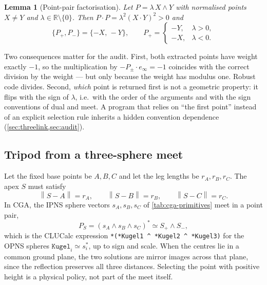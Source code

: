 \documentclass[11pt,a4paper]{article}
\theoremstyle{plain}
\newtheorem{lemma}{Lemma}
\theoremstyle{definition}
\theoremstyle{remark}
\newcommand{\R}{\mathbb{R}}
\newcommand{\einf}{e_{\infty}}
\newcommand{\norm}[1]{\left\lVert#1\right\rVert}
\begin{document}
\begin{lemma}[Point-pair factorisation]\label{lem:pointpair}
Let $P=\lambda\,X\wedge Y$ with normalised points $X\neq Y$ and
$\lambda\in\R\setminus\{0\}$. Then $P\cdot P=\lambda^2(X\cdot Y)^2>0$ and
\begin{equation}
  \{P_+,P_-\}=\{-X,\,-Y\},
  \qquad
  P_+=\begin{cases}-Y,&\lambda>0,\\ -X,&\lambda<0.\end{cases}
\end{equation}
\end{lemma}

Two consequences matter for the audit. First, both extracted points have weight
exactly $-1$, so the multiplication by $-P_\pm\cdot\einf=-1$ coincides with the
correct division by the weight --- but only because the weight has modulus one.
Robust code divides. Second, \emph{which} point is returned first is not a
geometric property: it flips with the sign of $\lambda$, i.e.\ with the order of
the arguments and with the sign conventions of dual and meet. A program that
relies on ``the first point'' instead of an explicit selection rule inherits a
hidden convention dependence (\cref{sec:threelink,sec:audit}).

\subsection{Tripod from a three-sphere meet}\label{sec:tripod}

Let the fixed base points be $A,B,C$ and let the leg lengths be $r_A,r_B,r_C$.
The apex $S$ must satisfy
\begin{equation}
  \norm{S-A}=r_A,
  \qquad
  \norm{S-B}=r_B,
  \qquad
  \norm{S-C}=r_C.
  \label{eq:tripod-constraints}
\end{equation}
In CGA, the IPNS sphere vectors $s_A,s_B,s_C$ of \cref{tab:cga-primitives} meet
in a point pair,
\begin{equation}
  P_S=\left(s_A\wedge s_B\wedge s_C\right)^{*} \simeq S_+\wedge S_-,
  \label{eq:tripod-meet}
\end{equation}
which is the CLUCalc expression \texttt{*(*Kugel1 \^{} *Kugel2 \^{} *Kugel3)}
for the OPNS spheres $\texttt{Kugel}_i\simeq s_i^{*}$, up to sign and scale. When the centres lie in a common
ground plane, the two solutions are mirror images across that plane, since the
reflection preserves all three distances. Selecting the point with positive
height is a physical policy, not part of the meet itself.
\end{document}
